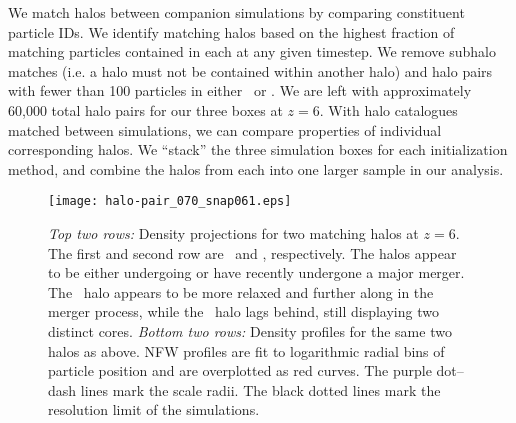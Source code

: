 

We match halos between companion simulations by comparing constituent particle IDs.  We identify matching halos based on the highest fraction of matching particles contained in each at any given timestep.  We remove subhalo matches (i.e. a halo must not be contained within another halo) and halo pairs with fewer than 100 particles in either \lpt\ or \za.  We are left with approximately 60,000 total halo pairs for our three boxes at $z = 6$.  With halo catalogues matched between simulations, we can compare properties of individual corresponding halos.  We ``stack'' the three simulation boxes for each initialization method, and combine the halos from each into one larger sample in our analysis.






\begin{figure}[t]
    \centering
    \texttt{[image: halo-pair\_070\_snap061.eps]}
    \caption[Comparison of matched \lpt\ and \za\ halos]{\footnotesize \textit{Top two rows:}  Density projections for two matching halos at $z = 6$.  The first and second row are \lpt\ and \za, respectively.  The halos appear to be either undergoing or have recently undergone a major merger.  The \lpt\ halo appears to be more relaxed and further along in the merger process, while the \za\ halo lags behind, still displaying two distinct cores.  \textit{Bottom two rows:}  Density profiles for the same two halos as above.  NFW profiles are fit to logarithmic radial bins of particle position and are overplotted as red curves.  The purple dot--dash lines mark the scale radii.  The black dotted lines mark the resolution limit of the simulations.}
    \label{fig:halo-pair}
\end{figure}

